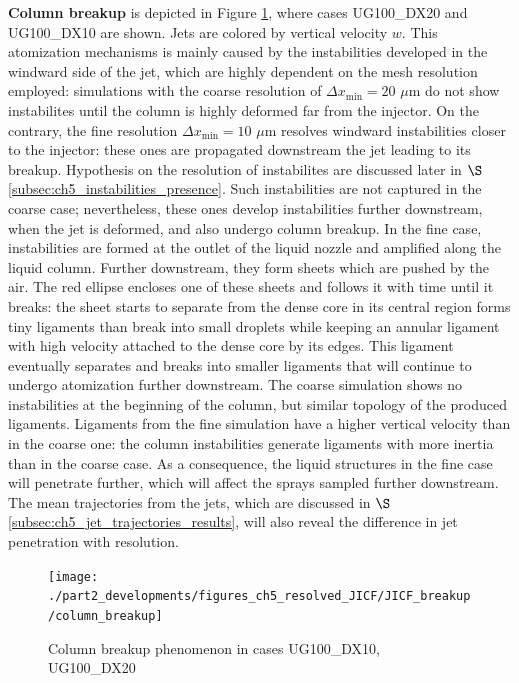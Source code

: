 \textbf{Column breakup} is depicted in Figure \ref{fig:jicf_column_breakup_ug100}, where cases UG100\_DX20 and UG100\_DX10 are shown. Jets are colored by vertical velocity $w$. This atomization mechanisms is mainly caused by the instabilities developed in the windward side of the jet, which are highly dependent on the mesh resolution employed: simulations with the coarse resolution of $\Delta x_\mathrm{min} = 20$ $\mu$m do not show instabilites until the column is highly deformed far from the injector. On the contrary, the fine resolution $\Delta x_\mathrm{min} = 10$ $\mu$m resolves windward instabilities closer to the injector: these ones are propagated downstream the jet leading to its breakup. Hypothesis on the resolution of instabilites are discussed later in $\S$\ref{subsec:ch5_instabilities_presence}. Such instabilities are not captured in the coarse case; nevertheless, these ones develop instabilities further downstream, when the jet is deformed, and also undergo column breakup. In the fine case, instabilities are formed at the outlet of the liquid nozzle and amplified along the liquid column. Further downstream, they form sheets which are pushed by the air. The red ellipse encloses one of these sheets and follows it with time until it breaks: the sheet starts to separate from the dense core in its central region forms tiny ligaments than break into small droplets while keeping an annular ligament with high velocity attached to the dense core by its edges. This ligament eventually separates and breaks into smaller ligaments that will continue to undergo atomization further downstream. The coarse simulation shows no instabilities at the beginning of the column, but similar topology of the produced ligaments. Ligaments from the fine simulation have a higher vertical velocity than in the coarse one: the column instabilities generate ligaments with more inertia than in the coarse case. As a consequence, the liquid structures in the fine case will penetrate further, which will affect the sprays sampled further downstream. The mean trajectories from the jets, which are discussed in $\S$\ref{subsec:ch5_jet_trajectories_results}, will also reveal the difference in jet penetration with resolution. 



\clearpage

\begin{figure}[ht]
\centering
\texttt{[image: ./part2\_developments/figures\_ch5\_resolved\_JICF/JICF\_breakup/column\_breakup]}
\caption{Column breakup phenomenon in cases UG100\_DX10, UG100\_DX20}
\label{fig:jicf_column_breakup_ug100}
\end{figure}




